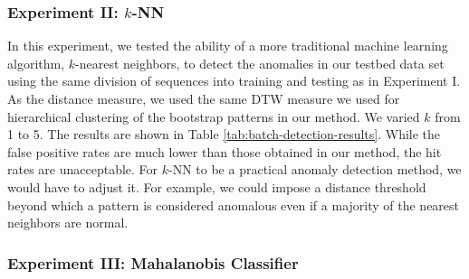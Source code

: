 \DIFaddend 

\subsubsection{Experiment II: $k$-NN}

In this experiment, we tested the ability of a more traditional
machine learning algorithm, $k$-nearest neighbors, to detect the
anomalies in our testbed data set using the same division of sequences
into training and testing as in Experiment I.  As the distance
measure, we used the same DTW measure we used for hierarchical
clustering of the bootstrap patterns in our method.  We varied $k$
from 1 to 5.  The results are shown in
Table \ref{tab:batch-detection-results}. While the false positive rates are much
lower than those obtained in our method, the hit rates are
unacceptable.  For $k$-NN to be a practical anomaly detection method,
we would have to adjust it.  For example, we could impose a distance
threshold beyond which a pattern is considered anomalous even if a
majority of the nearest neighbors are normal.


\subsubsection{Experiment III: Mahalanobis Classifier}

